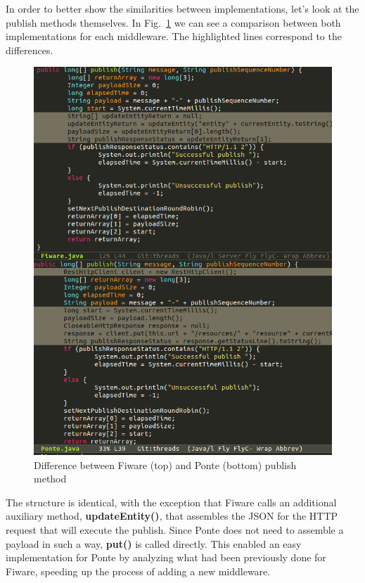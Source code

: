 \documentclass[conference]{IEEEtran}
\begin{document}
In order to better show the similarities between implementations, let's look at the publish methods themselves. In Fig.~\ref{fig:fiware_ponte_diff} we can see a comparison between both implementations for each middleware. The highlighted lines correspond to the differences.

\begin{figure}[htbp!]
  \centering
  \includegraphics[width=\columnwidth]{figures/fiware_ponte_diff.png}
  \caption{Difference between Fiware (top) and Ponte (bottom) publish method}
  \label{fig:fiware_ponte_diff}
\end{figure}

The structure is identical, with the exception that Fiware calls an additional auxiliary method, \textbf{updateEntity()}, that assembles the JSON for the HTTP request that will execute the publish. Since Ponte does not need to assemble a payload in such a way, \textbf{put()} is called directly. This enabled an easy implementation for Ponte by analyzing what had been previously done for Fiware, speeding up the process of adding a new middleware.
\end{document}
